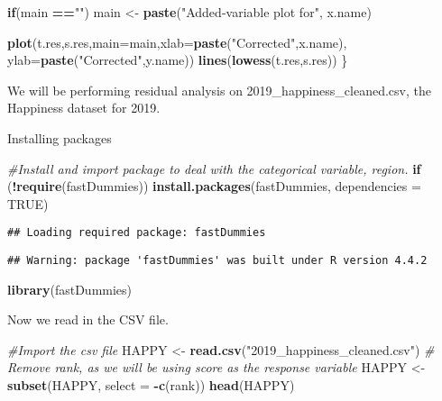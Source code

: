 \documentclass[
]{article}
\newenvironment{Shaded}{\begin{snugshade}}{\end{snugshade}}
\newcommand{\AttributeTok}[1]{\textcolor[rgb]{0.13,0.29,0.53}{#1}}
\newcommand{\CommentTok}[1]{\textcolor[rgb]{0.56,0.35,0.01}{\textit{#1}}}
\newcommand{\ConstantTok}[1]{\textcolor[rgb]{0.56,0.35,0.01}{#1}}
\newcommand{\ControlFlowTok}[1]{\textcolor[rgb]{0.13,0.29,0.53}{\textbf{#1}}}
\newcommand{\FunctionTok}[1]{\textcolor[rgb]{0.13,0.29,0.53}{\textbf{#1}}}
\newcommand{\NormalTok}[1]{#1}
\newcommand{\OtherTok}[1]{\textcolor[rgb]{0.56,0.35,0.01}{#1}}
\newcommand{\SpecialCharTok}[1]{\textcolor[rgb]{0.81,0.36,0.00}{\textbf{#1}}}
\newcommand{\StringTok}[1]{\textcolor[rgb]{0.31,0.60,0.02}{#1}}
\begin{document}
\begin{Shaded}
\begin{Highlighting}[]
  \ControlFlowTok{if}\NormalTok{(main }\SpecialCharTok{==}\StringTok{""}\NormalTok{)}
\NormalTok{    main }\OtherTok{\textless{}{-}} \FunctionTok{paste}\NormalTok{(}\StringTok{"Added{-}variable plot for"}\NormalTok{, x.name)}
  
  \FunctionTok{plot}\NormalTok{(t.res,s.res,}\AttributeTok{main=}\NormalTok{main,}\AttributeTok{xlab=}\FunctionTok{paste}\NormalTok{(}\StringTok{"Corrected"}\NormalTok{,x.name),}
       \AttributeTok{ylab=}\FunctionTok{paste}\NormalTok{(}\StringTok{"Corrected"}\NormalTok{,y.name))}
  \FunctionTok{lines}\NormalTok{(}\FunctionTok{lowess}\NormalTok{(t.res,s.res))}
\NormalTok{\}}
\end{Highlighting}
\end{Shaded}

We will be performing residual analysis on 2019\_happiness\_cleaned.csv,
the Happiness dataset for 2019.

Installing packages

\begin{Shaded}
\begin{Highlighting}[]
\CommentTok{\#Install and import package to deal with the categorical variable, region.}
\ControlFlowTok{if}\NormalTok{ (}\SpecialCharTok{!}\FunctionTok{require}\NormalTok{(fastDummies)) }\FunctionTok{install.packages}\NormalTok{(}\StringTok{\textquotesingle{}fastDummies\textquotesingle{}}\NormalTok{, }\AttributeTok{dependencies =} \ConstantTok{TRUE}\NormalTok{)}
\end{Highlighting}
\end{Shaded}

\begin{verbatim}
## Loading required package: fastDummies
\end{verbatim}

\begin{verbatim}
## Warning: package 'fastDummies' was built under R version 4.4.2
\end{verbatim}

\begin{Shaded}
\begin{Highlighting}[]
\FunctionTok{library}\NormalTok{(fastDummies)}
\end{Highlighting}
\end{Shaded}

Now we read in the CSV file.

\begin{Shaded}
\begin{Highlighting}[]
\CommentTok{\#Import the csv file}
\NormalTok{HAPPY }\OtherTok{\textless{}{-}} \FunctionTok{read.csv}\NormalTok{(}\StringTok{"2019\_happiness\_cleaned.csv"}\NormalTok{)}
\CommentTok{\# Remove rank, as we will be using score as the response variable}
\NormalTok{HAPPY }\OtherTok{\textless{}{-}} \FunctionTok{subset}\NormalTok{(HAPPY, }\AttributeTok{select =} \SpecialCharTok{{-}}\FunctionTok{c}\NormalTok{(rank))}
\FunctionTok{head}\NormalTok{(HAPPY)}
\end{Highlighting}
\end{Shaded}
\end{document}

